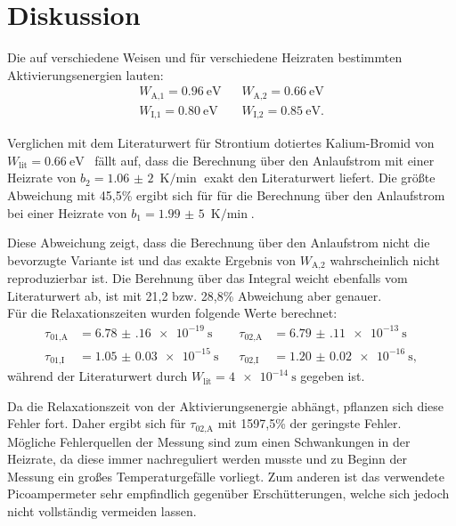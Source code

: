 \section{Diskussion}
Die auf verschiedene Weisen und für verschiedene Heizraten bestimmten Aktivierungsenergien lauten:
\begin{align*}
  W_\text{A,1}=\SI{0,96}{\eV}\;\;\;&W_\text{A,2}=\SI{0,66}{\eV}\\
  W_\text{I,1}=\SI{0,80}{\eV}\;\;\;&W_\text{I,2}=\SI{0,85}{\eV}.
\end{align*}

Verglichen mit dem Literaturwert für Strontium dotiertes
Kalium-Bromid von ${W_\text{lit}=\SI{0,66}{\eV} }$~\cite{literaturwert}
fällt auf, dass die Berechnung über den Anlaufstrom mit einer Heizrate von $b_2=\SI{1,06(2)}{\K\per\min}$
exakt den Literaturwert liefert. Die größte Abweichung mit 45,5\% ergibt sich für für die Berechnung über den
Anlaufstrom bei einer Heizrate von $b_1=\SI{1,99(5)}{\K\per\min}$.

Diese Abweichung zeigt, dass
die Berechnung über den Anlaufstrom nicht die bevorzugte Variante ist und das exakte Ergebnis von $W_\text{A,2}$
wahrscheinlich nicht reproduzierbar ist.
Die Berehnung über das Integral weicht ebenfalls vom Literaturwert ab, ist mit 21,2 bzw. 28,8\% Abweichung aber
genauer.
\\
Für die Relaxationszeiten wurden folgende Werte berechnet:
\begin{align*}
\tau_\text{01,A}&=\SI{6.78(16)e-19}{\s}\;\;\;&\tau_\text{02,A}&=\SI{6.79(11)e-13}{\s}\\
\tau_\text{01,I}&=\SI{1.05(3)e-15}{\s}\;\;\;&\tau_\text{02,I}&=\SI{1.20(2)e-16}{\s},
\end{align*}
während der Literaturwert durch $W_\text{lit}=\SI{4e-14}{\s}$ \cite{literaturwert}
gegeben ist.

Da die Relaxationszeit von der Aktivierungsenergie abhängt, pflanzen sich diese Fehler fort.
Daher ergibt sich für $\tau_\text{02,A}$ mit 1597,5\% der geringste Fehler.
\\
Mögliche Fehlerquellen der Messung sind zum einen Schwankungen in der Heizrate, da diese immer nachreguliert werden
musste und zu Beginn der Messung ein großes Temperaturgefälle vorliegt. Zum anderen ist das verwendete
Picoampermeter sehr empfindlich gegenüber Erschütterungen, welche sich jedoch nicht vollständig vermeiden lassen.
